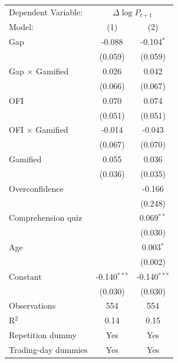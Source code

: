 \begin{tabular}{lcc}
   \tabularnewline \midrule \midrule
   Dependent Variable: & \multicolumn{2}{c}{$\Delta \log P_{t+1}$}\\
   Model:                 & (1)            & (2)\\  
   \midrule
   Gap                    & -0.088         & -0.104$^{*}$\\   
                          & (0.059)        & (0.059)\\   
   Gap $\times$ Gamified  & 0.026          & 0.042\\   
                          & (0.066)        & (0.067)\\   
   OFI                    & 0.070          & 0.074\\   
                          & (0.051)        & (0.051)\\   
   OFI $\times$ Gamified  & -0.014         & -0.043\\   
                          & (0.067)        & (0.070)\\   
   Gamified               & 0.055          & 0.036\\   
                          & (0.036)        & (0.035)\\   
   Overconfidence         &                & -0.166\\   
                          &                & (0.248)\\   
   Comprehension quiz     &                & 0.069$^{**}$\\   
                          &                & (0.030)\\   
   Age                    &                & 0.003$^{*}$\\   
                          &                & (0.002)\\   
   Constant               & -0.140$^{***}$ & -0.140$^{***}$\\   
                          & (0.030)        & (0.030)\\   
   \midrule
   Observations           & 554            & 554\\  
   R$^2$                  & 0.14           & 0.15\\  
   Repetition dummy       & Yes            & Yes\\  
   Trading-day dummies    & Yes            & Yes\\  
   \midrule \midrule
\end{tabular}
